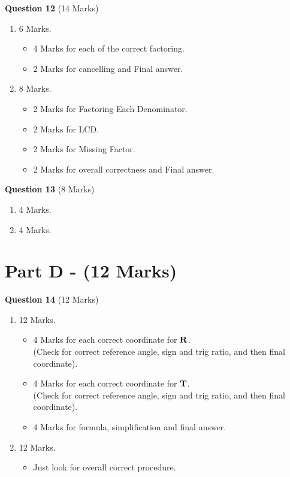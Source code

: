 \documentclass[12pt]{article} %
\begin{document}
\textbf{Question 12} (14 Marks)
\begin{enumerate}[label=(\alph*)]
  \item 6 Marks.
    \begin{itemize}
      \item 4 Marks for each of the correct factoring.
      \item 2 Marks for cancelling and Final answer.
    \end{itemize}

    \newpage

  \item 8 Marks.
    \begin{itemize}
      \item 2 Marks for Factoring Each Denominator.
      \item 2 Marks for LCD.
      \item 2 Marks for Missing Factor.
      \item 2 Marks for overall correctness and Final answer.
    \end{itemize}
\end{enumerate}


\textbf{Question 13} (8 Marks)
\begin{multicols}{2}
  \begin{enumerate}[label=(\alph*)]
    \item 4 Marks.
      \columnbreak
    \item 4 Marks.
  \end{enumerate}
\end{multicols}

\section*{Part D - (12 Marks)}

\textbf{Question 14} (12 Marks)
\begin{enumerate}[label=(\alph*)]
  \item 12 Marks.
    \begin{itemize}
      \item 4 Marks for each correct coordinate for $\vb R$.\\ (Check for correct reference angle, sign and trig
        ratio, and then final coordinate).
      \item 4 Marks for each correct coordinate for $\vb T$.\\ (Check for correct reference angle, sign and trig
        ratio, and then final coordinate).
      \item 4 Marks for formula, simplification and final answer.
    \end{itemize}

  \item 12 Marks.
    \begin{itemize}
      \item Just look for overall correct procedure.
    \end{itemize}
\end{enumerate}
\end{document}
